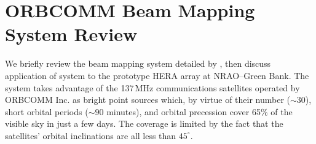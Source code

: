 \documentclass[preprint]{aastex}
\begin{document}








\section{ORBCOMM Beam Mapping System Review}

We briefly review the beam mapping system detailed by \citet{neben15}, then discuss application of system to the prototype HERA array at NRAO--Green Bank. The system takes advantage of the 137\,MHz communications satellites operated by ORBCOMM Inc. as bright point sources which, by virtue of their number ($\sim30$), short orbital periods ($\sim90$ minutes), and orbital precession cover 65\% of the visible sky in just a few days. The coverage is limited by the fact that the satellites' orbital inclinations are all less than $45^\circ$. 
\end{document}
